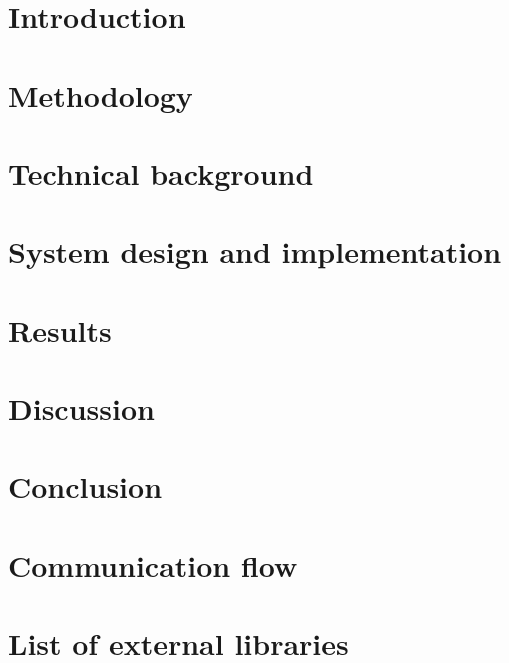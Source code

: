 \documentclass[Report.tex]{subfiles}
\begin{document}
\chapter{Introduction}\label{sec:intro}
  

\chapter{Methodology}\label{sec:methodology}
  

\chapter{Technical background}\label{sec:tech}
  

\chapter{System design and implementation}\label{sec:system}
  

\chapter{Results}\label{sec:results}
  

\chapter{Discussion}\label{sec:discussion}
  

\chapter{Conclusion}\label{sec:conclusion}
  

\nocite{*} %
\clearpage
\printbibliography%
\clearpage

\begin{appendices}
\chapter{Communication flow}
  

\chapter{List of external libraries}
  
\end{appendices}
\end{document}
